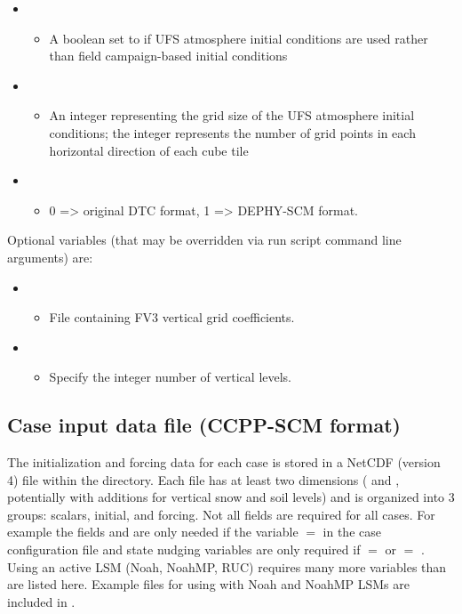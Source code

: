 \begin{itemize}
\begin{itemize}
	\end{itemize}
\item {}
	\begin{itemize}
	\item A boolean set to  if UFS atmosphere initial conditions are used rather than field campaign-based initial conditions
	\end{itemize}
\item {}
	\begin{itemize}
	\item An integer representing the grid size of the UFS atmosphere initial conditions; the integer represents the number of grid points in each horizontal direction of each cube tile
	\end{itemize}
\item {}
        \begin{itemize}
        \item  0 => original DTC format, 1 => DEPHY-SCM format.
        \end{itemize}
\end{itemize}

Optional variables (that may be overridden via run script command line arguments) are:
\begin{itemize}
\item {}
        \begin{itemize}
          \item File containing FV3 vertical grid coefficients.
        \end{itemize}
\item {}
	\begin{itemize}
	\item Specify the integer number of vertical levels.
	\end{itemize}
\end{itemize}

\subsection{Case input data file (CCPP-SCM format)}
\label{subsection: case input}

The initialization and forcing data for each case is stored in a NetCDF (version 4) file within the  directory. Each file has at least two dimensions ( and , potentially with additions for vertical snow and soil levels) and is organized into 3 groups: scalars, initial, and forcing. Not all fields are required for all cases. For example the fields  and  are only needed if the variable  $=$  in the case configuration file and state nudging variables are only required if  $=$  or  $=$ . Using an active LSM (Noah, NoahMP, RUC) requires many more variables than are listed here. Example files for using with Noah and NoahMP LSMs are included in .

